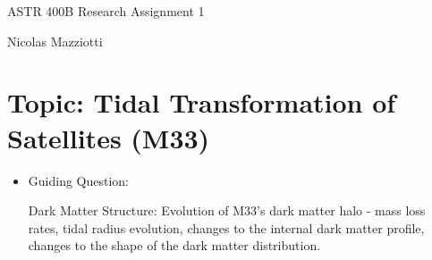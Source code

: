 \documentclass{article}
\begin{document}
ASTR 400B Research Assignment 1

Nicolas Mazziotti

\section*{Topic: Tidal Transformation of Satellites (M33)}

\begin{itemize}
    \item Guiding Question:
    
    Dark Matter Structure: Evolution of M33’s dark matter halo - mass loss rates,
tidal radius evolution, changes to the internal dark matter profile, changes to the
shape of the dark matter distribution.
\end{itemize}
\end{document}
